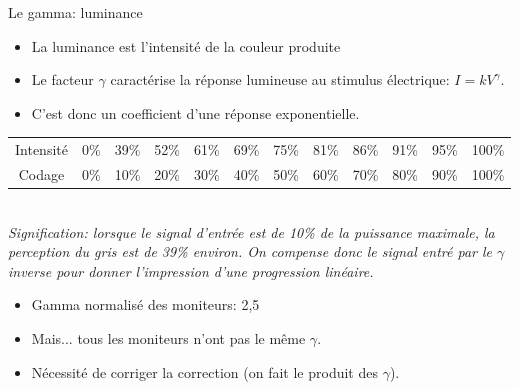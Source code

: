 \begin{frame}{Le gamma: luminance}
  \begin{itemize}
  \item La luminance est l'intensité de la couleur produite
  \item Le facteur $\gamma$ caractérise la réponse lumineuse au stimulus
    électrique: $I=kV^\gamma$.
  \item[\dialogwarning] C'est donc un coefficient d'une réponse exponentielle.
  \end{itemize}
  \begin{center}\renewcommand{\tabcolsep}{1mm}\color{red}
    \begin{tabular}{cccccccccccc}
      Intensité &
      \cellcolor[gray]{.0} 0\%&
      \cellcolor[gray]{.39} 39\%&
      \cellcolor[gray]{.52} 52\%&
      \cellcolor[gray]{.61} 61\%&
      \cellcolor[gray]{.69} 69\%&
      \cellcolor[gray]{.75} 75\%&
      \cellcolor[gray]{.81} 81\%&
      \cellcolor[gray]{.86} 86\%&
      \cellcolor[gray]{.91} 91\%&
      \cellcolor[gray]{.95} 95\%&
      \cellcolor[gray]{1} 100\%\\
      Codage &
      \cellcolor[gray]{.0} 0\% &
      \cellcolor[gray]{.1} 10\% &
      \cellcolor[gray]{.2} 20\% &
      \cellcolor[gray]{.3} 30\% &
      \cellcolor[gray]{.4} 40\% &
      \cellcolor[gray]{.5} 50\% &
      \cellcolor[gray]{.6} 60\% &
      \cellcolor[gray]{.7} 70\% &
      \cellcolor[gray]{.8} 80\% &
      \cellcolor[gray]{.9} 90\% &
      \cellcolor[gray]{1} 100\%\\
    \end{tabular}\\
    \color{solarizedRebase3}\small\itshape
    Signification: lorsque le signal d'entrée est de 10\% de la puissance
    maximale, la perception du gris est de 39\% environ. On compense donc le
    signal entré par le $\gamma$ inverse pour donner l'impression d'une
    progression linéaire.
  \end{center}
  \begin{itemize}
  \item Gamma normalisé des moniteurs: 2,5
  \item[\dialogerror] Mais... tous les moniteurs n'ont pas le même $\gamma$.
  \item Nécessité de corriger la correction (on fait le produit des $\gamma$).
  \end{itemize}
\end{frame}
